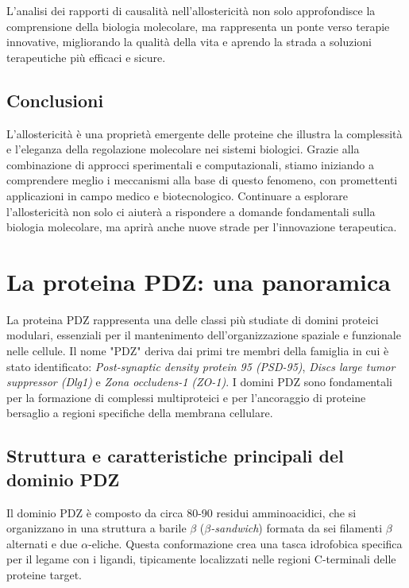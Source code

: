 \documentclass[Lau,binding=0.6cm,oneside,noexaminfo]{sapthesis}
\begin{document}
L'analisi dei rapporti di causalità nell'allostericità non solo approfondisce la comprensione della biologia molecolare, ma rappresenta un ponte verso terapie innovative, migliorando la qualità della vita e aprendo la strada a soluzioni terapeutiche più efficaci e sicure.
\subsection*{Conclusioni}
L’allostericità è una proprietà emergente delle proteine che illustra la complessità e l’eleganza della regolazione molecolare nei sistemi biologici. Grazie alla combinazione di approcci sperimentali e computazionali, stiamo iniziando a comprendere meglio i meccanismi alla base di questo fenomeno, con promettenti applicazioni in campo medico e biotecnologico. Continuare a esplorare l’allostericità non solo ci aiuterà a rispondere a domande fondamentali sulla biologia molecolare, ma aprirà anche nuove strade per l’innovazione terapeutica.

\section*{La proteina PDZ: una panoramica}

La proteina PDZ rappresenta una delle classi più studiate di domini proteici modulari, essenziali per il mantenimento dell’organizzazione spaziale e funzionale nelle cellule. Il nome "PDZ" deriva dai primi tre membri della famiglia in cui è stato identificato: \emph{Post-synaptic density protein 95 (PSD-95)}, \emph{Discs large tumor suppressor (Dlg1)} e \emph{Zona occludens-1 (ZO-1)}. I domini PDZ sono fondamentali per la formazione di complessi multiproteici e per l’ancoraggio di proteine bersaglio a regioni specifiche della membrana cellulare.

\subsection*{Struttura e caratteristiche principali del dominio PDZ}

Il dominio PDZ è composto da circa 80-90 residui amminoacidici, che si organizzano in una struttura a barile $\beta$ (\emph{$\beta$-sandwich}) formata da sei filamenti $\beta$ alternati e due $\alpha$-eliche. Questa conformazione crea una tasca idrofobica specifica per il legame con i ligandi, tipicamente localizzati nelle regioni C-terminali delle proteine target.
\end{document}

